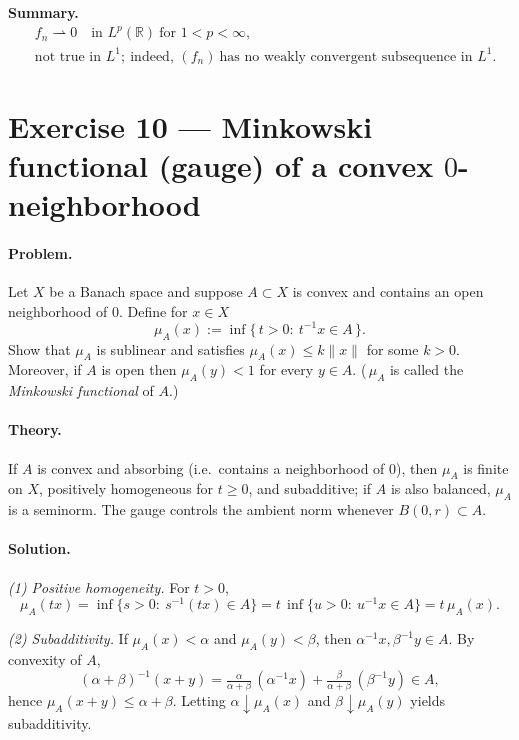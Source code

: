 \documentclass[12pt,a4paper]{article}
\theoremstyle{plain}
\theoremstyle{definition}
\theoremstyle{remark}
\theoremstyle{remark}
\theoremstyle{definition}
\begin{document}
	\bigskip
	\noindent\textbf{Summary.}
	\[
	\begin{aligned}
		&f_n \rightharpoonup 0 \quad \text{in } L^p(\mathbb R)\ \text{for } 1<p<\infty,\\[0.3em]
		&\text{not true in } L^1;\ \text{indeed, } (f_n)\ \text{has no weakly convergent subsequence in } L^1.
	\end{aligned}
	\]
	
	\section*{Exercise 10 — Minkowski functional (gauge) of a convex $0$-neighborhood}
	
	\paragraph{Problem.}
	Let $X$ be a Banach space and suppose $A\subset X$ is convex and contains an open neighborhood of $0$.
	Define for $x\in X$
	\[
	\mu_A(x):=\inf\{\,t>0:\ t^{-1}x\in A\,\}.
	\]
	Show that $\mu_A$ is sublinear and satisfies $\mu_A(x)\le k\|x\|$ for some $k>0$. 
	Moreover, if $A$ is open then $\mu_A(y)<1$ for every $y\in A$.
	(\,$\mu_A$ is called the \emph{Minkowski functional} of $A$.)
	
	\paragraph{Theory.}
	If $A$ is convex and absorbing (i.e.\ contains a neighborhood of $0$), then $\mu_A$ is finite on $X$,
	positively homogeneous for $t\ge0$, and subadditive; if $A$ is also balanced, $\mu_A$ is a seminorm.
	The gauge controls the ambient norm whenever $B(0,r)\subset A$.
	
	\paragraph{Solution.}
	\emph{(1) Positive homogeneity.}
	For $t>0$,
	\[
	\mu_A(tx)
	=\inf\{s>0:\ s^{-1}(tx)\in A\}
	=t\, \inf\{u>0:\ u^{-1}x\in A\}
	=t\,\mu_A(x).
	\]
	
	\noindent
	\emph{(2) Subadditivity.}
	If $\mu_A(x)<\alpha$ and $\mu_A(y)<\beta$, then $\alpha^{-1}x,\beta^{-1}y\in A$.
	By convexity of $A$,
	\[
	(\alpha+\beta)^{-1}(x+y)
	=\tfrac{\alpha}{\alpha+\beta}\,(\alpha^{-1}x)+\tfrac{\beta}{\alpha+\beta}\,(\beta^{-1}y)\in A,
	\]
	hence $\mu_A(x+y)\le \alpha+\beta$.
	Letting $\alpha\downarrow\mu_A(x)$ and $\beta\downarrow\mu_A(y)$ yields subadditivity.
	
\end{document}
